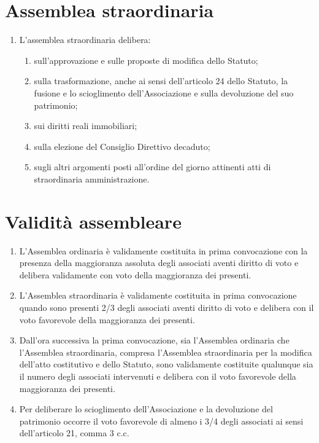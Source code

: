 \documentclass{djtsasddoc}
\begin{document}
	\section{Assemblea straordinaria}
	\begin{enumerate}
		\item L'assemblea straordinaria delibera:
		\begin{enumerate}
			\item sull'approvazione e sulle proposte di modifica dello Statuto;
			\item sulla trasformazione, anche ai sensi dell'articolo 24 dello Statuto, la fusione e lo scioglimento dell'Associazione e sulla devoluzione del suo patrimonio;
			\item sui diritti reali immobiliari;
			\item sulla elezione del Consiglio Direttivo decaduto;
			\item sugli altri argomenti posti all'ordine del giorno attinenti atti di straordinaria amministrazione.
		\end{enumerate}
	\end{enumerate}
	
	\section{Validità assembleare}
	\begin{enumerate}
		\item L'Assemblea ordinaria è validamente costituita in prima convocazione con la presenza della maggioranza assoluta degli associati aventi diritto di voto e delibera validamente con voto della maggioranza dei presenti.
		\item L'Assemblea straordinaria è validamente costituita in prima convocazione quando sono presenti 2/3 degli associati aventi diritto di voto e delibera con il voto favorevole della maggioranza dei presenti.
		\item Dall'ora successiva la prima convocazione, sia l'Assemblea ordinaria che l'Assemblea straordinaria, compresa l'Assemblea straordinaria per la modifica dell'atto costitutivo e dello Statuto,  sono validamente costituite qualunque sia il numero degli associati intervenuti e delibera con il voto favorevole della maggioranza dei presenti.
		\item Per deliberare lo scioglimento dell'Associazione e la devoluzione del patrimonio occorre il voto favorevole di almeno i 3/4 degli associati ai sensi dell'articolo 21, comma 3 c.c.
	\end{enumerate}
	
\end{document}
